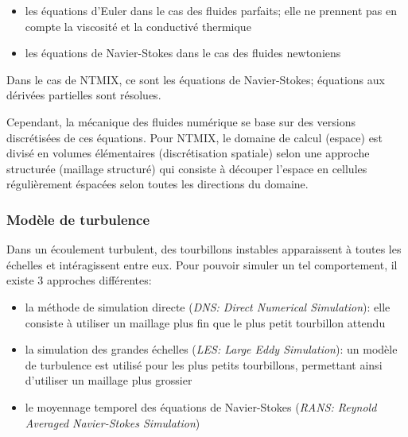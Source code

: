 \begin{itemize}
\item les équations d'Euler dans le cas des fluides parfaits; elle ne prennent pas en compte la viscosité et la conductivé thermique
\item les équations de Navier-Stokes dans le cas des fluides newtoniens
\end{itemize}


Dans le cas de NTMIX, ce sont les équations de Navier-Stokes; équations aux dérivées partielles sont résolues.

Cependant, la mécanique des fluides numérique se base sur des versions discrétisées de ces équations. Pour NTMIX, le domaine de calcul (espace) est divisé en volumes élémentaires (discrétisation spatiale) selon une approche structurée (maillage structuré) qui consiste à découper l'espace en cellules régulièrement éspacées selon toutes les directions du domaine.


\subsubsection{Modèle de turbulence}
Dans un écoulement turbulent, des tourbillons instables apparaissent à toutes les échelles et intéragissent entre eux. Pour pouvoir simuler un tel comportement, il existe 3 approches différentes:

\begin{itemize}
\item la méthode de simulation directe (\textit{DNS: Direct Numerical Simulation}): elle consiste à utiliser un maillage plus fin que le plus petit tourbillon attendu
\item la simulation des grandes échelles (\textit{LES: Large Eddy Simulation}): un modèle de turbulence est utilisé pour les plus petits tourbillons, permettant ainsi d'utiliser un maillage plus grossier
\item le moyennage temporel des équations de Navier-Stokes (\textit{RANS: Reynold Averaged Navier-Stokes Simulation})
\end{itemize} 


